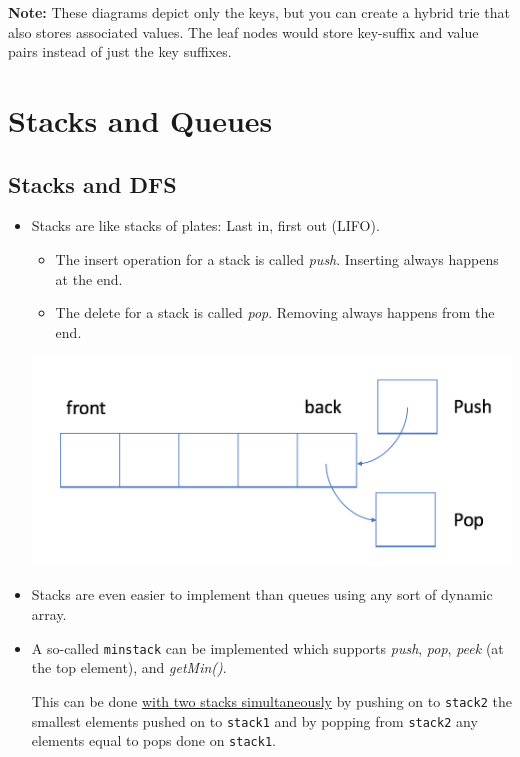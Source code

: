 \documentclass[12pt]{article}
\begin{document}
	\textbf{Note:} These diagrams depict only the keys, but you can create a hybrid trie that also stores associated values. The leaf nodes would store key-suffix and value pairs instead of just the key suffixes.
	
	\section*{Stacks and Queues}
	\subsection*{Stacks and DFS}
	\label{sec:Stack}
	\begin{itemize}
		\item Stacks are like stacks of plates: Last in, first out (LIFO).
		
		\begin{itemize}
			\item The insert operation for a stack is called \emph{push}. Inserting always happens at the end.
			\item The delete for a stack is called \emph{pop}. Removing always happens from the end.
		\end{itemize}
		\begin{center}
			\includegraphics[scale=0.5]{img/PushPop.png}
		\end{center}
	
		\item Stacks are even easier to implement than queues using any sort of dynamic array.
		
		\item A so-called \texttt{minstack} can be implemented which supports \emph{push}, \emph{pop}, \emph{peek} (at the top element), and \emph{getMin()}. 
		
		This can be done \href{https://leetcode.com/problems/min-stack/discuss/2281964/Java-Solution}{with two stacks simultaneously} by pushing on to \texttt{stack2} the smallest elements pushed on to \texttt{stack1} and by popping from \texttt{stack2} any elements equal to pops done on \texttt{stack1}.
		

\end{itemize}
\end{document}
